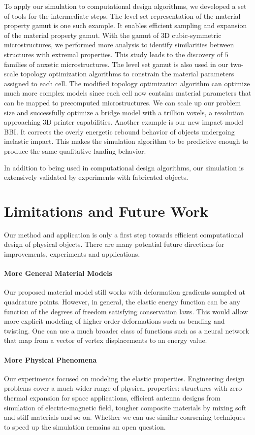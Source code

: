 To apply our simulation to computational design algorithms, we developed a set of tools for the intermediate steps.
The level set representation of the material property gamut is one such example.
It enables efficient sampling and expansion of the material property gamut.
With the gamut of 3D cubic-symmetric microstructures, we performed more analysis to identify similarities between structures with extremal properties.
This study leads to the discovery of $5$ families of auxetic microstructures.
The level set gamut is also used in our two-scale topology optimization algorithms to constrain the material parameters assigned to each cell.
The modified topology optimization algorithm can optimize much more complex models since each cell now contains material parameters that can be mapped to precomputed microstructures.
We can scale up our problem size and successfully optimize a bridge model with a trillion voxels, a resolution approaching 3D printer capabilities.
Another example is our new impact model BBI.
It corrects the overly energetic rebound behavior of objects undergoing inelastic impact.
This makes the simulation algorithm to be predictive enough to produce the same qualitative landing behavior.

In addition to being used in computational design algorithms, our simulation is extensively validated by experiments with fabricated objects.
\section{Limitations and Future Work}
Our method and application is only a first step towards efficient computational design of physical objects.
There are many potential future directions for improvements, experiments and applications.
\paragraph{More General Material Models}
Our proposed material model still works with deformation gradients sampled at quadrature points.
However, in general, the elastic energy function can be any function of the degrees of freedom satisfying conservation laws.
This would allow more explicit modeling of higher order deformations such as bending and twisting.
One can use a much broader class of functions such as a neural network that map from a vector of vertex displacements to an energy value.
\paragraph{More Physical Phenomena}
Our experiments focused on modeling the elastic properties.
Engineering design problems cover a much wider range of physical properties: structures with zero thermal expansion for space applications, 
efficient antenna designs from simulation of electric-magnetic field, 
tougher composite materials by mixing soft and stiff materials and so on.
Whether we can use similar coarsening techniques to speed up the simulation remains an open question.
